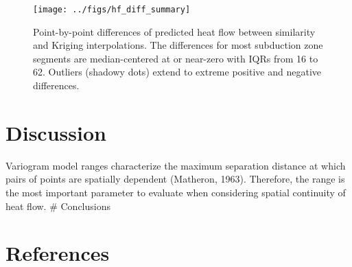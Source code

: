 \documentclass[draft,linenumbers]{agujournal2018}
\begin{document}
\begin{figure}[h]

{\centering \texttt{[image: ../figs/hf\_diff\_summary]} 

}

\caption{Point-by-point differences of predicted heat flow between similarity and Kriging interpolations. The differences for most subduction zone segments are median-centered at or near-zero with IQRs from 16 to 62. Outliers (shadowy dots) extend to extreme positive and negative differences.}\label{fig:diff.summary.plot}
\end{figure}

\section{Discussion}

Variogram model ranges characterize the maximum separation distance at
which pairs of points are spatially dependent (Matheron, 1963).
Therefore, the range is the most important parameter to evaluate when
considering spatial continuity of heat flow. \# Conclusions

\acknowledgments

\clearpage

\section*{References}
\end{document}

